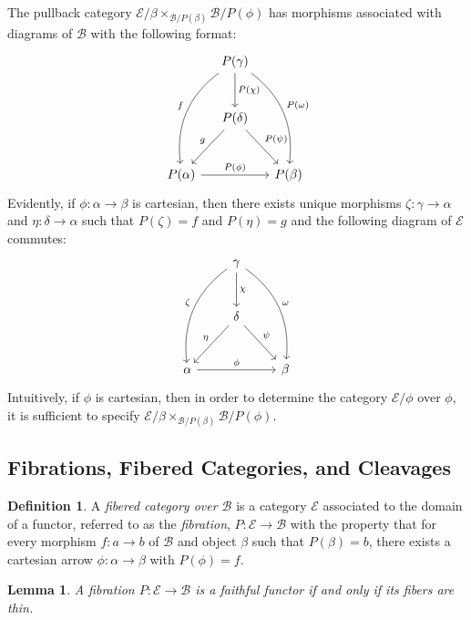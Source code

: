 \documentclass[12pt]{article}
\newtheorem{lemma}[theorem]{Lemma}
\theoremstyle{definition}
\newtheorem{definition}{Definition}[section]
\theoremstyle{remark}
\newcommand{\catB}{\mathcal{B}}
\newcommand{\catE}{\mathcal{E}}
\begin{document}
The pullback category $\catE / \beta \times_{\catB / P(\beta)} \catB / P(\phi)$ has morphisms associated with diagrams of $\catB$ with the following format:
\begin{equation}
    \begin{tikzcd}[row sep=large, column sep=small]
        & P(\gamma) \arrow[d, "P(\chi)"] \arrow[ddl, bend right, "f"'] \arrow[ddr, bend left, "P(\omega)"] & \\
        & P(\delta) \arrow[dl, "g"'] \arrow[dr, "P(\psi)"] & \\
        P(\alpha) \arrow[rr, "P(\phi)"] & & P(\beta)
    \end{tikzcd}
    \label{eq:pullback_category_cartesian}
\end{equation}
Evidently, if $\phi : \alpha \to \beta$ is cartesian, then there exists unique morphisms $\zeta : \gamma \to \alpha$ and $\eta : \delta \to \alpha$ such that $P(\zeta) = f$ and $P(\eta) = g$ and the following diagram of $\catE$ commutes:
\begin{equation}
    \begin{tikzcd}[row sep=large]
        & \gamma \arrow[d, "\chi"] \arrow[ddl, bend right, "\zeta"'] \arrow[ddr, bend left, "\omega"] & \\
        & \delta \arrow[dl, "\eta"'] \arrow[dr, "\psi"] & \\
        \alpha \arrow[rr, "\phi"] & & \beta
    \end{tikzcd}
    \label{eq:cartesian_over_category}
\end{equation}
Intuitively, if $\phi$ is cartesian, then in order to determine the category $\catE/\phi$ over $\phi$, it is sufficient to specify $\catE / \beta \times_{\catB / P(\beta)} \catB / P(\phi)$.

\subsection{Fibrations, Fibered Categories, and Cleavages}

\begin{definition}
    A \textit{fibered category over $\catB$} is a category $\catE$ associated to the domain of a functor, referred to as the \textit{fibration}, $P : \catE \to \catB$ with the property that for every morphism $f : a \to b$ of $\catB$ and object $\beta$ such that $P(\beta) = b$, there exists a cartesian arrow $\phi : \alpha \to \beta$ with $P(\phi) = f$.
\end{definition}

\begin{lemma}
    A fibration $P : \catE \to \catB$ is a faithful functor if and only if its fibers are thin.
\end{lemma}
\end{document}
